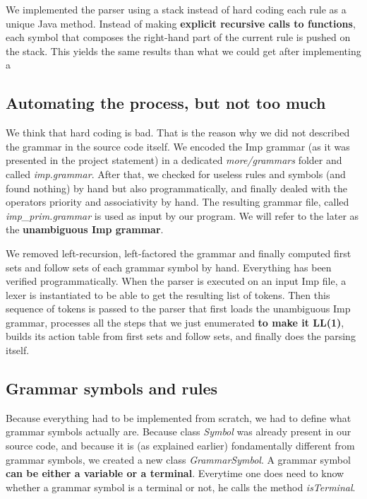 We implemented the parser using a stack instead of hard coding each rule as a unique Java method. Instead of making
\textbf{explicit recursive calls to functions}, each symbol that composes the right-hand part of the current rule is pushed
on the stack. This yields the same results than what we could get after implementing a

\subsection{Automating the process, but not too much}

We think that hard coding is bad. That is the reason why we did not described the grammar in the source code itself.
We encoded the Imp grammar (as it was presented in the project statement) in a dedicated \textit{more/grammars} folder and called \textit{imp.grammar}.
After that, we checked for useless rules and symbols (and found nothing) by hand but also programmatically, and finally dealed with
the operators priority and associativity by hand. The resulting grammar file, called \textit{imp\_prim.grammar} is used as input by our program.
We will refer to the later as the \textbf{unambiguous Imp grammar}.

We removed left-recursion, left-factored the grammar and finally computed first sets and follow sets of each grammar symbol by hand. 
Everything has been verified programmatically. When the parser is executed on an input Imp file, a lexer is instantiated to be able
to get the resulting list of tokens. Then this sequence of tokens is passed to the parser that first loads the unambiguous Imp grammar,
processes all the steps that we just enumerated \textbf{to make it LL(1)}, 
builds its action table from first sets and follow sets, and finally does the parsing itself.

\subsection{Grammar symbols and rules}

Because everything had to be implemented from scratch, we had to define what grammar symbols actually are. Because class \textit{Symbol}
was already present in our source code, and because it is (as explained earlier) fondamentally different from grammar symbols,
we created a new class \textit{GrammarSymbol}. A grammar symbol \textbf{can be either a variable or a terminal}. Everytime one does need
to know whether a grammar symbol is a terminal or not, he calls the method \textit{isTerminal}.

